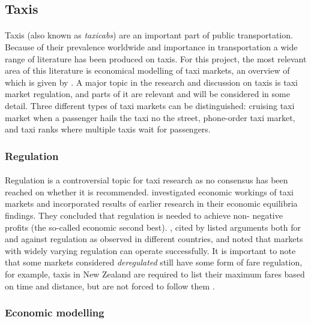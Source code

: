 \subsection{Taxis}
\label{sec:taxis}

\paragraph{} Taxis (also known as \textit{taxicabs}) are an important part of
public transportation. Because of their prevalence worldwide and importance in
transportation a wide range of literature has been produced on taxis. For this
project, the most relevant area of this literature is economical modelling of
taxi markets, an overview of which is given by
\textcite{Salanova2011taxi+review}. A major topic in the research and
discussion on taxis is taxi market regulation, and parts of it are relevant and
will be considered in some detail. Three different types of taxi markets can be
distinguished: cruising taxi market when a passenger hails the taxi no the
street, phone-order taxi market, and taxi ranks where multiple taxis wait for
passengers. 

\subsubsection{Regulation}

\paragraph{}Regulation is a controversial topic for taxi research as no
consensus has been reached on whether it is recommended.
\textcite{Cairns1996taxi+competition} investigated economic workings of taxi
markets and incorporated results of earlier research in their economic
equilibria findings. They concluded that regulation is needed to achieve non-
negative profits (the so-called economic second best).
\textcite{Oecd2007taxi+policy}, cited by \textcite{Salanova2011taxi+review}
listed arguments both for and against regulation as observed in different
countries, and noted that markets with widely varying regulation can operate
successfully. It is important to note that some markets considered
\textit{deregulated} still have some form of fare regulation, for example,
taxis in New Zealand are required to list their maximum fares based on time and
distance, but are not forced to follow them
\parencite{Gaunt1995taxi+newzealand}.

\subsubsection{Economic modelling} 

